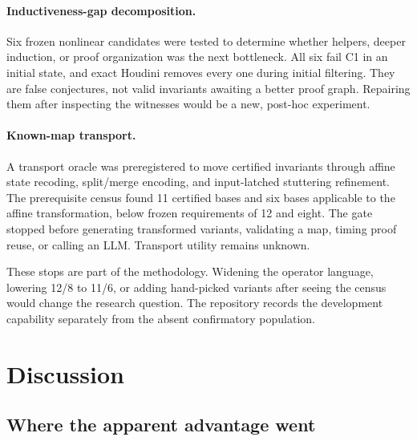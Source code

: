 \documentclass[10pt]{article}
\begin{document}
\paragraph{Inductiveness-gap decomposition.}
Six frozen nonlinear candidates were tested to determine whether helpers,
deeper induction, or proof organization was the next bottleneck.  All six fail
C1 in an initial state, and exact Houdini removes every one during initial
filtering.  They are false conjectures, not valid invariants awaiting a better
proof graph.  Repairing them after inspecting the witnesses would be a new,
post-hoc experiment.

\paragraph{Known-map transport.}
A transport oracle was preregistered to move certified invariants through
affine state recoding, split/merge encoding, and input-latched stuttering
refinement.  The prerequisite census found 11 certified bases and six bases
applicable to the affine transformation, below frozen requirements of 12 and
eight.  The gate stopped before generating transformed variants, validating a
map, timing proof reuse, or calling an LLM.  Transport utility remains unknown.

These stops are part of the methodology.  Widening the operator language,
lowering 12/8 to 11/6, or adding hand-picked variants after seeing the census
would change the research question.  The repository records the development
capability separately from the absent confirmatory population.

\section{Discussion}

\subsection{Where the apparent advantage went}
\end{document}
